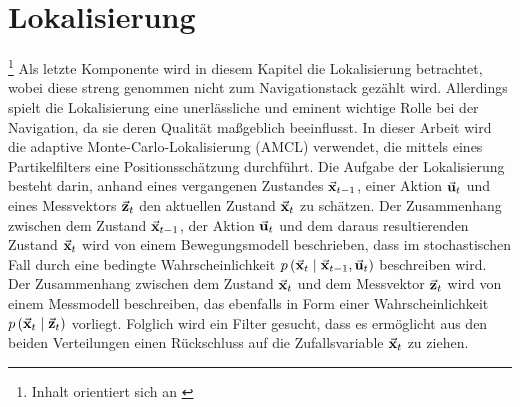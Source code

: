 \chapter{Lokalisierung}\footnote{Inhalt orientiert sich an \cite[S. 237 ff]{ProbRob}}
Als letzte Komponente wird in diesem Kapitel die Lokalisierung betrachtet, wobei diese streng genommen nicht zum Navigationstack gezählt wird. Allerdings spielt die Lokalisierung eine unerlässliche und eminent wichtige Rolle bei der Navigation, da sie deren Qualität maßgeblich beeinflusst. In dieser Arbeit wird die adaptive Monte-Carlo-Lokalisierung (AMCL) verwendet, die mittels eines Partikelfilters eine Positionsschätzung durchführt.
Die Aufgabe der Lokalisierung besteht darin, anhand eines vergangenen Zustandes $\vec{\mathbf{x}}_{t-1}$, einer Aktion $\vec{\mathbf{u}}_t$ und eines Messvektors $\vec{\mathbf{z}}_t$ den aktuellen Zustand $\vec{\mathbf{x}}_t$ zu schätzen. Der Zusammenhang zwischen dem Zustand $\vec{\mathbf{x}}_{t-1}$, der Aktion $\vec{\mathbf{u}}_t$ und dem daraus resultierenden Zustand $\vec{\mathbf{x}}_t$ wird von einem Bewegungsmodell beschrieben, dass im stochastischen Fall durch eine bedingte Wahrscheinlichkeit $p\left({\vec{\mathbf{x}}_t} \hspace{1mm} \vert \hspace{1mm} {\vec{\mathbf{x}}_{t-1},\vec{\mathbf{u}}_t}\right)$ beschreiben wird.
Der Zusammenhang zwischen dem Zustand $\vec{\mathbf{x}}_t$ und dem Messvektor $\vec{\mathbf{z}}_t$ wird von einem Messmodell beschreiben, das ebenfalls in Form einer Wahrscheinlichkeit $p\left({\vec{\mathbf{x}}_t} \hspace{1mm} \vert \hspace{1mm} {\vec{\mathbf{z}}_t}\right)$ vorliegt. Folglich wird ein Filter gesucht, dass es ermöglicht aus den beiden Verteilungen einen Rückschluss auf die Zufallsvariable $\vec{\mathbf{x}}_t$ zu ziehen.

\newpage
